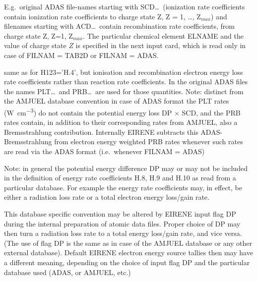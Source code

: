 \begin{description}
\begin{description}
                E.g.\ original \ac{ADAS} file-names starting with SCD\dots\ (ionization rate
                coefficients contain ionization rate coefficients to charge state Z, Z = 1,
                \dots, Z$_{max}$) and filenames starting with  ACD\dots\ contain recombination
                rate coefficients, from charge state Z, Z=1, Z$_{max}$.
                The particular chemical element ELNAME and the value of charge state $Z$ is
                specified in the next input card, which is read only in case of FILNAM = TAB2D
                    or FILNAM = ADAS.
          \item[H.10] same as for H123='H.4', but ionisation and recombination electron
                energy loss rate coefficients rather than reaction rate coefficients.
                In the original \ac{ADAS} files the names PLT\dots\ and PRB\dots\ are used for
                those quantities.
                Note:
                distinct from the AMJUEL database convention in case of
                \ac{ADAS} format the PLT rates (\si{\watt\per\cubic\centi\metre}) do not
                contain the potential energy loss
                DP $\times$ SCD, and the PRB rates contain, in addition to
                their corresponding rates from AMJUEL, also
                a Bremsstrahlung contribution.
                Internally EIRENE subtracts this \acs{ADAS}-Bremsstrahlung from electron energy
                weighted PRB rates whenever such rates are read via the \ac{ADAS} format (i.e.\
                whenever FILNAM = ADAS)

                Note: in general the potential energy difference DP may or may not be included
                in the definition of energy rate coefficients H.8, H.9 and H.10 as read from a
                particular database.
                For example the energy rate coefficients may, in effect,  be either a radiation
                loss rate or a total electron energy loss/gain rate.

                This database specific convention may be altered by EIRENE input flag DP during
                the internal preparation of atomic data files.
                Proper choice of DP may then turn a radiation loss rate to a total energy
                loss/gain rate, and vice versa.
                (The use of flag DP is the same as in case of the AMJUEL database or any other
                external database).
                Default EIRENE electron energy source tallies then may have a different
                meaning, depending on the choice of input flag DP and the particular database
                used (\ac{ADAS}, or AMJUEL, etc.)
        \end{description}


\end{description}
